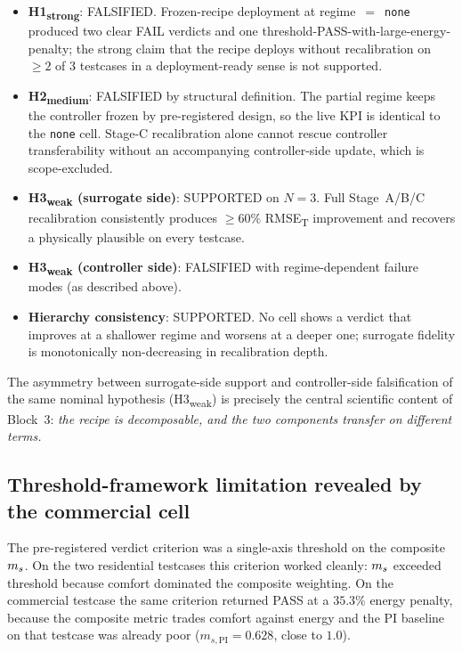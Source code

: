 \begin{itemize}
    \item \textbf{H1\textsubscript{strong}}: FALSIFIED. Frozen-recipe
    deployment at regime~$=$~\texttt{none} produced two clear FAIL
    verdicts and one threshold-PASS-with-large-energy-penalty; the strong
    claim that the recipe deploys without recalibration on $\geq 2$ of 3
    testcases in a deployment-ready sense is not supported.

    \item \textbf{H2\textsubscript{medium}}: FALSIFIED by structural
    definition. The partial regime keeps the controller frozen by
    pre-registered design, so the live KPI is identical to the
    \texttt{none} cell. Stage-C recalibration alone cannot rescue
    controller transferability without an accompanying controller-side
    update, which is scope-excluded.

    \item \textbf{H3\textsubscript{weak} (surrogate side)}: SUPPORTED on
    $N=3$. Full Stage~A/B/C recalibration consistently produces
    \(\geq 60\%\) RMSE\textsubscript{T} improvement and recovers a
    physically plausible \czon{} on every testcase.

    \item \textbf{H3\textsubscript{weak} (controller side)}: FALSIFIED with
    regime-dependent failure modes (as described above).

    \item \textbf{Hierarchy consistency}: SUPPORTED. No cell shows a
    verdict that improves at a shallower regime and worsens at a deeper
    one; surrogate fidelity is monotonically non-decreasing in
    recalibration depth.
\end{itemize}

The asymmetry between surrogate-side support and controller-side
falsification of the same nominal hypothesis (H3\textsubscript{weak}) is
precisely the central scientific content of Block~3: \emph{the recipe is
decomposable, and the two components transfer on different terms.}

\subsection{Threshold-framework limitation revealed by the commercial cell}
\label{ssec:res3_threshold_limitation}

The pre-registered verdict criterion was a single-axis threshold on the
composite \(m_s\). On the two residential testcases this criterion
worked cleanly: \(m_s\) exceeded threshold because comfort dominated
the composite weighting. On the commercial testcase the same criterion
returned PASS at a $35.3\%$ energy penalty, because the composite metric
trades comfort against energy and the PI baseline on that testcase was
already poor ($m_{s,\mathrm{PI}} = 0.628$, close to $1.0$).

